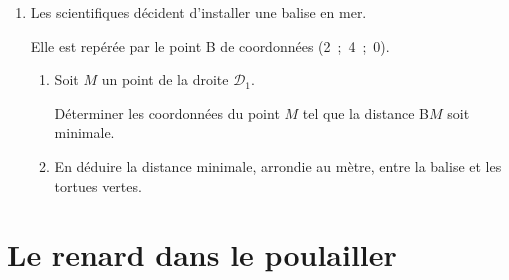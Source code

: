 \documentclass{cornouaille}
\begin{document}
\begin{exercice}
\begin{enumerate}
\begin{enumerate}
	\end{enumerate}
\item  Les scientifiques décident d'installer une balise en mer.

Elle est repérée par le point B de coordonnées (2~;~4~;~0).
	\begin{enumerate}
		\item Soit $M$ un point de la droite $\mathcal{D}_1$.
		
Déterminer les coordonnées du point $M$ tel que la distance B$M$ soit minimale.
		\item En déduire la distance minimale, arrondie au mètre, entre la balise et les tortues vertes.
	\end{enumerate}
\end{enumerate}
\end{exercice}

\section{Le renard dans le  poulailler}
\end{document}
